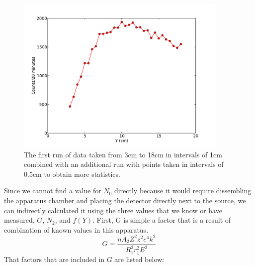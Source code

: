 \begin{figure}[H]
\begin{center}
\includegraphics[width=4in]{secondrun.pdf}
\caption{The first run of data taken from 3cm to 18cm in intervals of 1cm combined  with an additional run with points taken in intervals of 0.5cm to obtain more statistics.}
\end{center}
\end{figure}

Since we cannot find a value for $N_0$ directly because it would require dissembling the apparatus chamber and placing the detector directly next to the source, we can indirectly calculated it using the three values that we know or have measured, $G$, $N_2$, and $f(Y)$. First, G is simple a factor that is a result of combination of known values in this apparatus. 
\begin{equation}G=\frac{nA_2Z^2z^2e^4k^2}{R_1^2r_1^2  E^2}\end{equation}
That factors that are included in $G$ are listed below:

